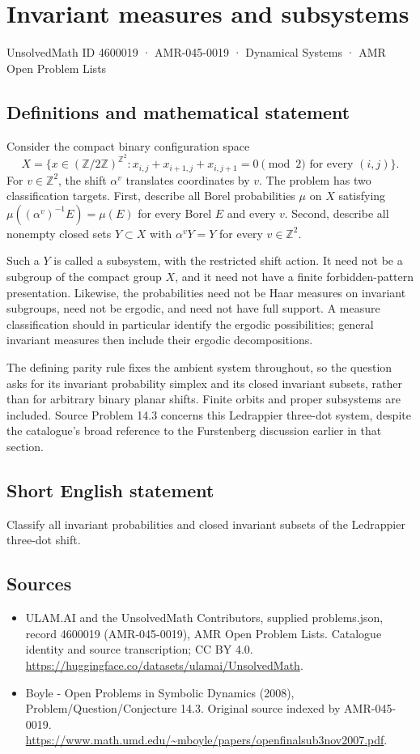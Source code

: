 \documentclass[11pt,a4paper]{article}
\begin{document}
\section*{Invariant measures and subsystems}\label{4600019}
{\small UnsolvedMath ID 4600019 · AMR-045-0019 · Dynamical Systems · AMR Open Problem Lists}
\subsection{Definitions and mathematical statement}
Consider the compact binary configuration space
\[
 X=\{x\in(\mathbb Z/2\mathbb Z)^{\mathbb Z^2}:
       x_{i,j}+x_{i+1,j}+x_{i,j+1}=0\pmod2
       \text{ for every }(i,j)\}.
\]
For $v\in\mathbb Z^2$, the shift $\alpha^v$ translates coordinates by
$v$. The problem has two classification targets. First, describe all
Borel probabilities $\mu$ on $X$ satisfying
$\mu((\alpha^v)^{-1}E)=\mu(E)$ for every Borel $E$ and every $v$.
Second, describe all nonempty closed sets $Y\subset X$ with
$\alpha^vY=Y$ for every $v\in\mathbb Z^2$.

Such a $Y$ is called a subsystem, with the restricted shift action.
It need not be a subgroup of the compact group $X$, and it need not
have a finite forbidden-pattern presentation. Likewise, the probabilities
need not be Haar measures on invariant subgroups, need not be ergodic,
and need not have full support. A measure classification should in
particular identify the ergodic possibilities; general invariant measures
then include their ergodic decompositions.

The defining parity rule fixes the ambient system throughout, so the
question asks for its invariant probability simplex and its closed
invariant subsets, rather than for arbitrary binary planar shifts.
Finite orbits and proper subsystems are included. Source Problem 14.3
concerns this Ledrappier three-dot system, despite the catalogue's broad
reference to the Furstenberg discussion earlier in that section.
\subsection{Short English statement}
Classify all invariant probabilities and closed invariant subsets of the Ledrappier three-dot shift.
\subsection{Sources}
\begin{itemize}
\item[S1] ULAM.AI and the UnsolvedMath Contributors, supplied problems.json, record 4600019 (AMR-045-0019), AMR Open Problem Lists. Catalogue identity and source transcription; CC BY 4.0.
\url{https://huggingface.co/datasets/ulamai/UnsolvedMath}.
\item[S2] Boyle - Open Problems in Symbolic Dynamics (2008), Problem/Question/Conjecture 14.3. Original source indexed by AMR-045-0019.
\url{https://www.math.umd.edu/~mboyle/papers/openfinalsub3nov2007.pdf}.
\end{itemize}
\end{document}
